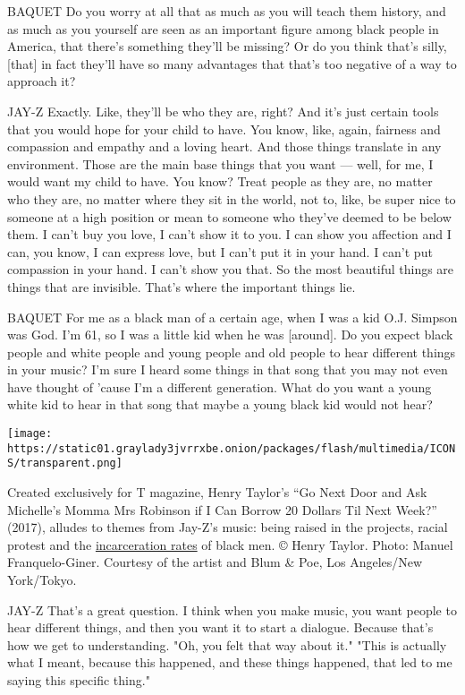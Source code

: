BAQUET Do you worry at all that as much as you will teach them history,
and as much as you yourself are seen as an important figure among black
people in America, that there's something they'll be missing? Or do you
think that's silly, {[}that{]} in fact they'll have so many advantages
that that's too negative of a way to approach it?

JAY-Z Exactly. Like, they'll be who they are, right? And it's just
certain tools that you would hope for your child to have. You know,
like, again, fairness and compassion and empathy and a loving heart. And
those things translate in any environment. Those are the main base
things that you want --- well, for me, I would want my child to have.
You know? Treat people as they are, no matter who they are, no matter
where they sit in the world, not to, like, be super nice to someone at a
high position or mean to someone who they've deemed to be below them. I
can't buy you love, I can't show it to you. I can show you affection and
I can, you know, I can express love, but I can't put it in your hand. I
can't put compassion in your hand. I can't show you that. So the most
beautiful things are things that are invisible. That's where the
important things lie.

BAQUET For me as a black man of a certain age, when I was a kid O.J.
Simpson was God. I'm 61, so I was a little kid when he was {[}around{]}.
Do you expect black people and white people and young people and old
people to hear different things in your music? I'm sure I heard some
things in that song that you may not even have thought of 'cause I'm a
different generation. What do you want a young white kid to hear in that
song that maybe a young black kid would not hear?

\texttt{[image: https://static01.graylady3jvrrxbe.onion/packages/flash/multimedia/ICONS/transparent.png]}

Created exclusively for T magazine, Henry Taylor's ``Go Next Door and
Ask Michelle's Momma Mrs Robinson if I Can Borrow 20 Dollars Til Next
Week?'' (2017), alludes to themes from Jay-Z's music: being raised in
the projects, racial protest and the
\href{https://www.nytimes3xbfgragh.onion/2017/11/17/opinion/jay-z-meek-mill-probation.html}{incarceration
rates} of black men. © Henry Taylor. Photo: Manuel Franquelo-Giner.
Courtesy of the artist and Blum \& Poe, Los Angeles/New York/Tokyo.

JAY-Z That's a great question. I think when you make music, you want
people to hear different things, and then you want it to start a
dialogue. Because that's how we get to understanding. "Oh, you felt that
way about it." "This is actually what I meant, because this happened,
and these things happened, that led to me saying this specific thing."

